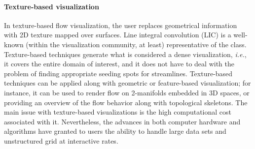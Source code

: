 \paragraph{Texture-based visualization} 
%
In texture-based flow visualization, the user replaces geometrical information with 2D texture mapped over surfaces. 
%
Line integral convolution (LIC) is a well-known (within the visualization community, at least) representative of the class. 
%
Texture-based techniques generate what is considered a dense visualization, \emph{i.e.}, it covers the entire domain of interest,
%
%
and it does not have to deal with the problem of finding appropriate seeding spots for streamlines. 
%
Texture-based techniques can be applied along with geometric or feature-based visualization; for instance, it can be used to render flow on 2-manifolds embedded in 3D spaces, or providing an overview of the flow behavior along with topological skeletons.
%
The main issue with texture-based visualizations is the high computational cost associated with it. 
%
Nevertheless, the advances in both computer hardware and algorithms have granted to users the ability to handle large data sets and unstructured grid at interactive rates\cite{Edmunds2012974, laramee2008applications}.

